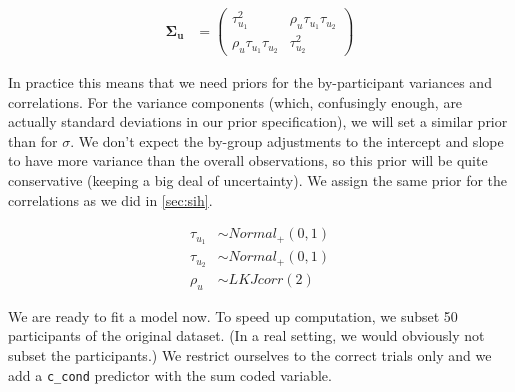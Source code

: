 \documentclass[12pt,]{krantz}
\newenvironment{Shaded}{\begin{snugshade}}{\end{snugshade}}
\newcommand{\KeywordTok}[1]{\textcolor[rgb]{0.13,0.29,0.53}{\textbf{#1}}}
\newcommand{\DataTypeTok}[1]{\textcolor[rgb]{0.13,0.29,0.53}{#1}}
\newcommand{\DecValTok}[1]{\textcolor[rgb]{0.00,0.00,0.81}{#1}}
\newcommand{\StringTok}[1]{\textcolor[rgb]{0.31,0.60,0.02}{#1}}
\newcommand{\CommentTok}[1]{\textcolor[rgb]{0.56,0.35,0.01}{\textit{#1}}}
\newcommand{\OperatorTok}[1]{\textcolor[rgb]{0.81,0.36,0.00}{\textbf{#1}}}
\newcommand{\NormalTok}[1]{#1}
\theoremstyle{definition}
\theoremstyle{definition}
\theoremstyle{definition}
\theoremstyle{remark}
\begin{document}
\begin{equation}
\begin{aligned}
 \boldsymbol{\Sigma_u} & = 
{\begin{pmatrix} 
\tau_{u_1}^2 & \rho_u \tau_{u_1} \tau_{u_2} \\ 
\rho_u \tau_{u_1} \tau_{u_2} & \tau_{u_2}^2
\end{pmatrix}}
\end{aligned}
\end{equation}

In practice this means that we need priors for the by-participant
variances and correlations. For the variance components (which,
confusingly enough, are actually standard deviations in our prior
specification), we will set a similar prior than for \(\sigma\). We
don't expect the by-group adjustments to the intercept and slope to have
more variance than the overall observations, so this prior will be quite
conservative (keeping a big deal of uncertainty). We assign the same
prior for the correlations as we did in \ref{sec:sih}.

\begin{equation}
\begin{aligned}
\tau_{u_1} &\sim Normal_+(0,1)\\
\tau_{u_2} &\sim Normal_+(0,1)\\
\rho_u &\sim LKJcorr(2) 
\end{aligned}
\end{equation}

We are ready to fit a model now. To speed up computation, we subset 50
participants of the original dataset. (In a real setting, we would
obviously not subset the participants.) We restrict ourselves to the
correct trials only and we add a \texttt{c\_cond} predictor with the sum
coded variable.

\begin{Shaded}
\end{Shaded}
\end{document}
